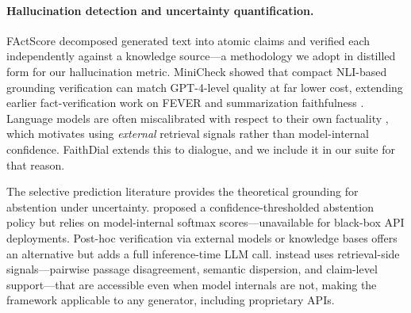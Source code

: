 \paragraph{Hallucination detection and uncertainty quantification.}
FActScore \citep{factscore2023} decomposed generated text into atomic claims and verified each independently against a knowledge source---a methodology we adopt in distilled form for our hallucination metric. MiniCheck \citep{minicheck2024} showed that compact NLI-based grounding verification can match GPT-4-level quality at far lower cost, extending earlier fact-verification work on FEVER \citep{thorne2018fever} and summarization faithfulness \citep{maynez2020faithfulness}. Language models are often miscalibrated with respect to their own factuality \citep{kadavath2022language,kuhn2023semantic,guo2017calibration,zhao2021calibrate}, which motivates using \emph{external} retrieval signals rather than model-internal confidence. FaithDial \citep{dziri2022faithdial} extends this to dialogue, and we include it in our suite for that reason.

The selective prediction literature \citep{geifman2017selective,varshney2022investigating} provides the theoretical grounding for abstention under uncertainty. \citet{chen2023selftransition} proposed a confidence-thresholded abstention policy but relies on model-internal softmax scores---unavailable for black-box API deployments. Post-hoc verification via external models or knowledge bases \citep{peng2023check,zhao2024knowcot} offers an alternative but adds a full inference-time LLM call. \method{} instead uses retrieval-side signals---pairwise passage disagreement, semantic dispersion, and claim-level support---that are accessible even when model internals are not, making the framework applicable to any generator, including proprietary APIs.
